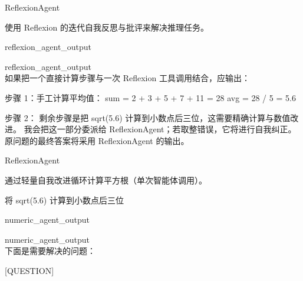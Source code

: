 \begin{userprompt}[title={用户提示词}]


\quad{}ReflexionAgent

\quad{}
使用 Reflexion 的迭代自我反思与批评来解决推理任务。

\quad{}

\qquad{}

\quad{}

\quad{}reflexion_agent_output


reflexion_agent_output \\


如果把一个直接计算步骤与一次 Reflexion 工具调用结合，应输出：


步骤 1：手工计算平均值：
\quad sum = 2 + 3 + 5 + 7 + 11 = 28
\quad avg = 28 / 5 = 5.6

步骤 2：
\quad 剩余步骤是把 sqrt(5.6) 计算到小数点后三位，这需要精确计算与数值改进。
\quad 我会把这一部分委派给 ReflexionAgent；若取整错误，它将进行自我纠正。
\quad 原问题的最终答案将采用 ReflexionAgent 的输出。



\quad{}ReflexionAgent

\quad{}
通过轻量自我改进循环计算平方根（单次智能体调用）。

\quad{}

\qquad{}将 sqrt(5.6) 计算到小数点后三位

\quad{}

\quad{}numeric_agent_output


numeric_agent_output \\


下面是需要解决的问题：

[QUESTION]


\end{userprompt}


